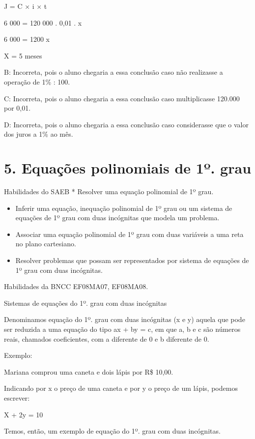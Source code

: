 J = C × i × t

6 000 = 120 000 . 0,01 . x

6 000 = 1200 x

X = 5 meses

B: Incorreta, pois o aluno chegaria a essa conclusão caso não realizasse
a operação de 1\% : 100.

C: Incorreta, pois o aluno chegaria a essa conclusão caso multiplicasse
120.000 por 0,01.

D: Incorreta, pois o aluno chegaria a essa conclusão caso considerasse
que o valor dos juros a 1\% ao mês.

\hypertarget{equauxe7uxf5es-polinomiais-de-1uxba.-grau}{%
\section{5. Equações polinomiais de 1º.
grau}\label{equauxe7uxf5es-polinomiais-de-1uxba.-grau}}

Habilidades do SAEB * Resolver uma equação polinomial de 1º grau.

\begin{itemize}
\item
  Inferir uma equação, inequação polinomial de 1º grau ou um sistema de
  equações de 1º grau com duas incógnitas que modela um problema.
\item
  Associar uma equação polinomial de 1º grau com duas variáveis a uma
  reta no plano cartesiano.
\item
  Resolver problemas que possam ser representados por sistema de
  equações de 1º grau com duas incógnitas.
\end{itemize}

Habilidades da BNCC EF08MA07, EF08MA08.

Sistemas de equações do 1º. grau com duas incógnitas

Denominamos equação do 1º. grau com duas incógnitas (x e y) aquela que
pode ser reduzida a uma equação do tipo ax + by = c, em que a, b e c são
números reais, chamados coeficientes, com a diferente de 0 e b diferente
de 0.

Exemplo:

Mariana comprou uma caneta e dois lápis por R\$ 10,00.

Indicando por x o preço de uma caneta e por y o preço de um lápis,
podemos escrever:

X + 2y = 10

Temos, então, um exemplo de equação do 1º. grau com duas incógnitas.

